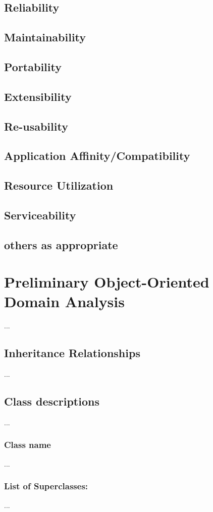 \documentclass[]{article}
\begin{document}
\subsection {Reliability}
\subsection {Maintainability}
\subsection {Portability}
\subsection {Extensibility}
\subsection {Re-usability}
\subsection {Application Affinity/Compatibility}
\subsection {Resource Utilization}
\subsection {Serviceability}
\subsection {others as appropriate}

\section{Preliminary Object-Oriented Domain Analysis}
...
\subsection{Inheritance Relationships}
...
\subsection{Class descriptions}
...
\subsubsection{ Class name}
... 
\subsubsection {List of Superclasses:} 
... 
\end{document}
